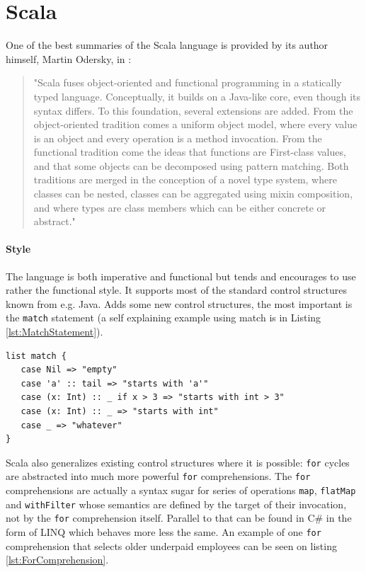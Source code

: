 \documentclass[12pt,a4paper]{report}
\begin{document}
\section{Scala}

One of the best summaries of the Scala language is provided by its author himself, Martin Odersky, in  \cite{ScalableComponents}:

\begin{quote}
"Scala fuses object-oriented and functional programming in a statically typed language. Conceptually, it builds on a Java-like core, even though its syntax differs. To this foundation, several extensions are added. From the object-oriented tradition comes a uniform object model, where every value is an object and every operation is a method invocation. From the functional tradition come the ideas that functions are First-class values, and that some objects can be decomposed using pattern matching. Both traditions are merged in the conception of a novel type system, where classes can be nested, classes can be aggregated using mixin composition, and where types are class members which can be either concrete or abstract."
\end{quote}

\paragraph{Style} The language is both imperative and functional but tends and encourages to use rather the functional style. It supports most of the standard control structures known from e.g. Java. Adds some new control structures, the most important is the \texttt{match} statement (a self explaining example using match is in Listing \ref{lst:MatchStatement}).

\begin{minipage}{\linewidth}
\begin{lstlisting}[caption={Match statement example.},label={lst:MatchStatement}]
list match {
   case Nil => "empty"
   case 'a' :: tail => "starts with 'a'"
   case (x: Int) :: _ if x > 3 => "starts with int > 3"
   case (x: Int) :: _ => "starts with int"
   case _ => "whatever"
}
\end{lstlisting}
\end{minipage}

Scala also generalizes existing control structures where it is possible: \texttt{for} cycles are abstracted into much more powerful \texttt{for} comprehensions. The \texttt{for} comprehensions are actually a syntax sugar for series of operations \texttt{map}, \texttt{flatMap} and \texttt{withFilter} whose semantics are defined by the target of their invocation, not by the \texttt{for} comprehension itself. Parallel to that can be found in C\# in the form of LINQ \cite{Linq} which behaves more less the same. An example of one \texttt{for} comprehension that selects older underpaid employees can be seen on listing \ref{lst:ForComprehension}.
\end{document}
